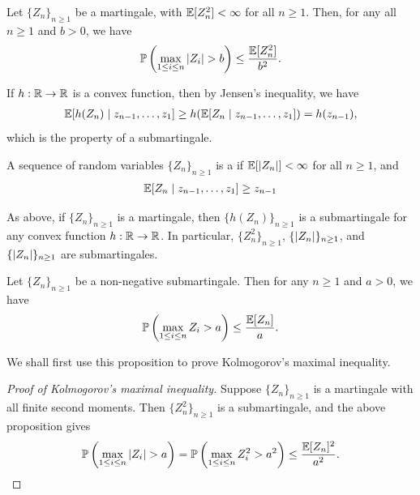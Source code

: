 \begin{theorem}
    Let $\{Z_{n}\}_{n \geq 1}$ be a martingale, with $\mathbb{E}[Z_{n}^{2}] < \infty$ for all $n \geq 1$. Then, for any all $n \geq 1$ and $b > 0$, we have
    \begin{align}
        \mathbb{P}\left( \max_{1 \leq i \leq n} \left| Z_{i} \right| > b \right) \leq \frac{\mathbb{E}[Z_{n}^{2}]}{b^{2}}.
    \end{align}
\end{theorem}

If $h:\mathbb{R} \to \mathbb{R}$ is a convex function, then by Jensen's inequality, we have
\begin{align}
    \mathbb{E}[h(Z_{n}) \mid z_{n-1},\ldots,z_{1}] \geq h(\mathbb{E}[Z_{n} \mid z_{n-1},\ldots,z_{1}]) = h(z_{n-1}),
\end{align}
which is the property of a submartingale.
\begin{definition}
    A sequence of random variables $\{Z_{n}\}_{n \geq 1}$ is a  if $\mathbb{E}[\left| Z_{n} \right|] < \infty$ for all $n \geq 1$, and
    \begin{align}
        \mathbb{E}[Z_{n} \mid z_{n-1},\ldots,z_{1}] \geq z_{n-1}
    \end{align}
\end{definition}
As above, if $\{Z_{n}\}_{n \geq 1}$ is a martingale, then $\{h(Z_{n})\}_{n \geq 1}$ is a submartingale for any convex function $h:\mathbb{R} \to \mathbb{R}$. In particular, $\{Z_{n}^{2}\}_{n \geq 1}$, $\{\left| Z_{n} \right|\}_{n \geq 1}$, and $\{\left| Z_{n} \right|\}_{n \geq 1}$ are submartingales.

\begin{proposition}
    Let $\{Z_{n}\}_{n \geq 1}$ be a non-negative submartingale. Then for any $n \geq 1$ and $a > 0$, we have
    \begin{align}
        \mathbb{P}\left( \max_{1 \leq i \leq n} Z_{i} > a \right) \leq \frac{\mathbb{E}[Z_{n}]}{a}.
    \end{align}
\end{proposition}
We shall first use this proposition to prove Kolmogorov's maximal inequality.
\begin{proof}[Proof of Kolmogorov's maximal inequality]
    Suppose $\{Z_{n}\}_{n \geq 1}$ is a martingale with all finite second moments. Then $\{Z_{n}^{2}\}_{n \geq 1}$ is a submartingale, and the above proposition gives
    \begin{align}
        \mathbb{P}\left(\max_{1 \leq i \leq n} \left| Z_{i} \right| > a\right) = \mathbb{P}\left(\max_{1 \leq i \leq n} Z_{i}^{2} > a^{2}\right) \leq \frac{\mathbb{E}[Z_{n}]^{2}}{a^{2}}.
    \end{align}
\end{proof}


